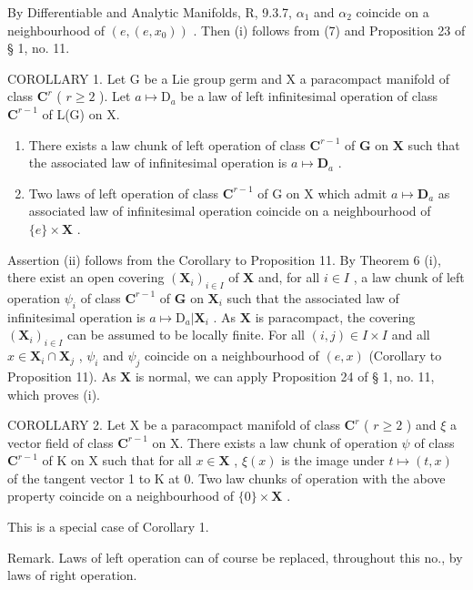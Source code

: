 By Differentiable and Analytic Manifolds, R, 9.3.7, \(\alpha_{1}\) and \(\alpha_{2}\) coincide on a neighbourhood of \((e, (e, x_{0}))\) . Then (i) follows from (7) and Proposition 23 of § 1, no. 11.

COROLLARY 1. Let G be a Lie group germ and X a paracompact manifold of class \(\mathbf{C}^r\) ( \(r \geqslant 2\) ). Let \(a \mapsto \mathrm{D}_a\) be a law of left infinitesimal operation of class \(\mathbf{C}^{r-1}\) of L(G) on X.

\begin{enumerate}
\def\labelenumi{(\roman{enumi})}
\item
  There exists a law chunk of left operation of class \(\mathbf{C}^{r-1}\) of \(\mathbf{G}\) on \(\mathbf{X}\) such that the associated law of infinitesimal operation is \(a \mapsto \mathbf{D}_a\) .
\item
  Two laws of left operation of class \(\mathbf{C}^{r-1}\) of G on X which admit \(a \mapsto \mathbf{D}_a\) as associated law of infinitesimal operation coincide on a neighbourhood of \(\{e\} \times \mathbf{X}\) .
\end{enumerate}

Assertion (ii) follows from the Corollary to Proposition 11. By Theorem 6 (i), there exist an open covering \((\mathbf{X}_i)_{i\in I}\) of \(\mathbf{X}\) and, for all \(i\in I\) , a law chunk of left operation \(\psi_i\) of class \(\mathbf{C}^{r-1}\) of \(\mathbf{G}\) on \(\mathbf{X}_i\) such that the associated law of infinitesimal operation is \(a\mapsto \mathrm{D}_a|\mathbf{X}_i\) . As \(\mathbf{X}\) is paracompact, the covering \((\mathbf{X}_i)_{i\in I}\) can be assumed to be locally finite. For all \((i,j)\in I\times I\) and all \(x\in \mathbf{X}_i\cap \mathbf{X}_j\) , \(\psi_i\) and \(\psi_j\) coincide on a neighbourhood of \((e,x)\) (Corollary to Proposition 11). As \(\mathbf{X}\) is normal, we can apply Proposition 24 of § 1, no. 11, which proves (i).

COROLLARY 2. Let X be a paracompact manifold of class \(\mathbf{C}^r\) ( \(r \geqslant 2\) ) and \(\xi\) a vector field of class \(\mathbf{C}^{r-1}\) on X. There exists a law chunk of operation \(\psi\) of class \(\mathbf{C}^{r-1}\) of K on X such that for all \(x \in \mathbf{X}\) , \(\xi(x)\) is the image under \(t \mapsto (t, x)\) of the tangent vector 1 to K at 0. Two law chunks of operation with the above property coincide on a neighbourhood of \(\{0\} \times \mathbf{X}\) .

This is a special case of Corollary 1.

Remark. Laws of left operation can of course be replaced, throughout this no., by laws of right operation.

